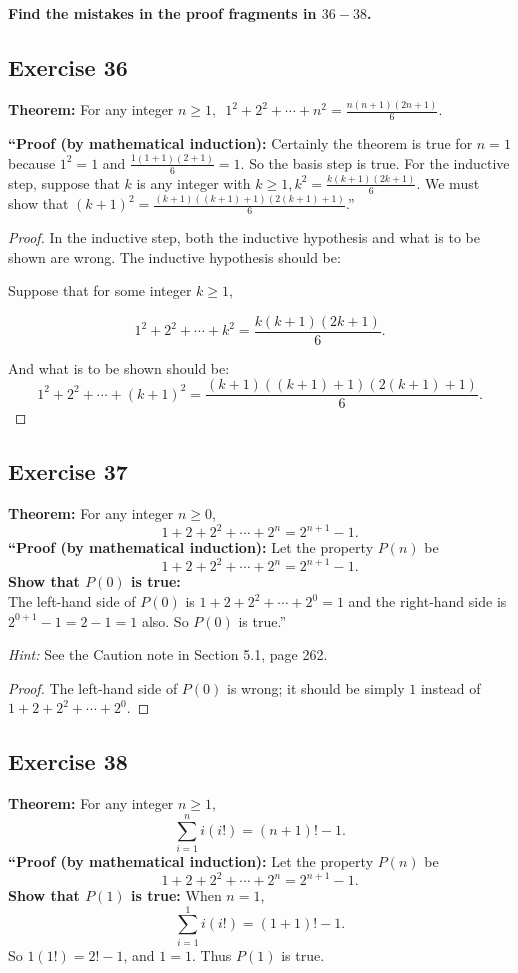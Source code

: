 \documentclass[14pt]{extarticle}
\newcommand{\dps}{\displaystyle}
\newcommand{\cy}{\color{cyan}}
\begin{document}
{\bf \cy Find the mistakes in the proof fragments in $36-38$.}

\subsection{Exercise 36}
{\bf Theorem:} For any integer $\dps n \geq 1, \,\,\, 1^2 + 2^2 + \cdots + n^2 = \frac{n(n+1)(2n+1)}{6}.$

{\bf ``Proof (by mathematical induction):} Certainly the theorem is true for $n = 1$ because $1^2 = 1$ and $\dps \frac{1(1+1)(2+1)}{6} = 1$. So the basis step is true. For the inductive step, suppose that $k$ is any integer with $\dps k \geq 1, k^2 = \frac{k(k+1)(2k+1)}{6}$. We must show that $\dps (k+1)^2 = \frac{(k+1)((k+1)+1)(2(k+1)+1)}{6}$.''

\begin{proof}
    In the inductive step, both the inductive hypothesis and what is to be shown are wrong. The inductive hypothesis should be:

    Suppose that for some integer $k \geq 1$,

    \[
        \dps 1^2 + 2^2 + \cdots + k^2 = \frac{k(k+1)(2k+1)}{6}.
    \]

    And what is to be shown should be:
    \[
        \dps 1^2 + 2^2 + \cdots + (k + 1)^2 = \frac{(k + 1)((k + 1) + 1)(2(k+1)+1)}{6}.
    \]
\end{proof}

\subsection{Exercise 37}
{\bf Theorem:} For any integer $n \geq 0$,
\[
    1 + 2 + 2^2 + \cdots + 2^n = 2^{n+1} - 1.
\]
{\bf ``Proof (by mathematical induction):} Let the property $P(n)$ be
\[
    1 + 2 + 2^2 + \cdots + 2^n = 2^{n+1} - 1.
\]
{\bf Show that $P(0)$ is true:} \\
The left-hand side of $P(0)$ is $1 + 2 + 2^2 + \cdots + 2^0 = 1$ and the right-hand side is $2^{0+1} - 1 = 2 - 1 = 1$ also. So $P(0)$ is true.''

{\it Hint:} See the Caution note in Section 5.1, page 262.

\begin{proof}
    The left-hand side of $P(0)$ is wrong; it should be simply $1$ instead of $1 + 2 + 2^2 + \cdots + 2^0$.
\end{proof}

\subsection{Exercise 38}
{\bf Theorem:} For any integer $n \geq 1$,
\[
    \sum_{i=1}^{n}i(i!) = (n+1)! - 1.
\]
{\bf ``Proof (by mathematical induction):} Let the property $P(n)$ be
\[
    1 + 2 + 2^2 + \cdots + 2^n = 2^{n+1} - 1.
\]
{\bf Show that $P(1)$ is true:} When $n = 1$,
\[
    \sum_{i=1}^{1}i(i!) = (1+1)! - 1.
\]
So $1(1!) = 2! - 1$, and $1 = 1$. Thus $P(1)$ is true.
\end{document}
